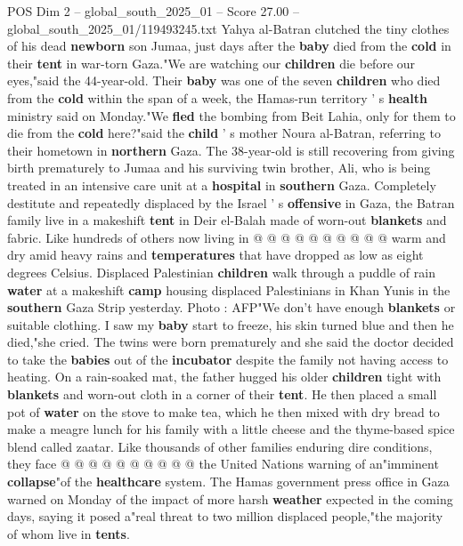 \begin{textsample}{POS Dim 2 – global\_south\_2025\_01 – Score 27.00 – global\_south\_2025\_01/119493245.txt}  \label{ex:f2_pos_314}
Yahya al-Batran clutched the tiny clothes of his dead \textbf{newborn} son Jumaa, just days after the \textbf{baby} died from the \textbf{cold} in their \textbf{tent} in war-torn Gaza."We are watching our \textbf{children} die before our eyes,"said the 44-year-old.
Their \textbf{baby} was one of the seven \textbf{children} who died from the \textbf{cold} within the span of a week, the Hamas-run territory ' s \textbf{health} ministry said on Monday."We \textbf{fled} the bombing from Beit Lahia, only for them to die from the \textbf{cold} here?"said the \textbf{child} ' s mother Noura al-Batran, referring to their hometown in \textbf{northern} Gaza.
The 38-year-old is still recovering from giving birth prematurely to Jumaa and his surviving twin brother, Ali, who is being treated in an intensive care unit at a \textbf{hospital} in \textbf{southern} Gaza.
Completely destitute and repeatedly displaced by the Israel ' s \textbf{offensive} in Gaza, the Batran family live in a makeshift \textbf{tent} in Deir el-Balah made of worn-out \textbf{blankets} and fabric.
Like hundreds of others now living in @ @ @ @ @ @ @ @ @ @ warm and dry amid heavy rains and \textbf{temperatures} that have dropped as low as eight degrees Celsius.
Displaced Palestinian \textbf{children} walk through a puddle of rain \textbf{water} at a makeshift \textbf{camp} housing displaced Palestinians in Khan Yunis in the \textbf{southern} Gaza Strip yesterday.
Photo : AFP"We don't have enough \textbf{blankets} or suitable clothing.
I saw my \textbf{baby} start to freeze, his skin turned blue and then he died,"she cried.
The twins were born prematurely and she said the doctor decided to take the \textbf{babies} out of the \textbf{incubator} despite the family not having access to heating.
On a rain-soaked mat, the father hugged his older \textbf{children} tight with \textbf{blankets} and worn-out cloth in a corner of their \textbf{tent}.
He then placed a small pot of \textbf{water} on the stove to make tea, which he then mixed with dry bread to make a meagre lunch for his family with a little cheese and the thyme-based spice blend called zaatar.
Like thousands of other families enduring dire conditions, they face @ @ @ @ @ @ @ @ @ @ the United Nations warning of an"imminent \textbf{collapse}"of the \textbf{healthcare} system.
The Hamas government press office in Gaza warned on Monday of the impact of more harsh \textbf{weather} expected in the coming days, saying it posed a"real threat to two million displaced people,"the majority of whom live in \textbf{tents}.

\end{textsample}
